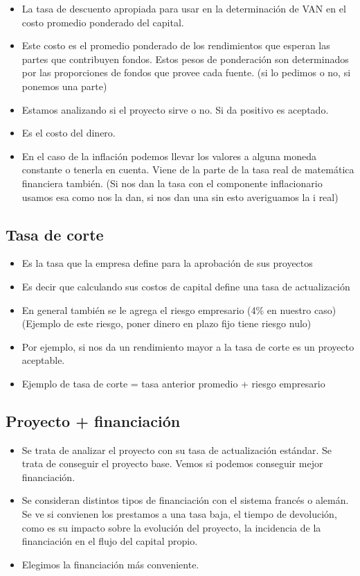 \documentclass[titlepage,a4paper]{article}
\begin{document}
\begin{itemize}
\item La tasa de descuento apropiada para usar en la determinación de VAN en el costo promedio ponderado del capital.
\item Este costo es el promedio ponderado de los rendimientos que esperan las partes que contribuyen fondos. Estos pesos de ponderación son determinados por las proporciones de fondos que provee cada fuente. (si lo pedimos o no, si ponemos una parte)
\item Estamos analizando si el proyecto sirve o no. Si da positivo es aceptado.
\item Es el costo del dinero.
\item En el caso de la inflación podemos llevar los valores a alguna moneda constante o tenerla en cuenta. Viene de la parte de la tasa real de matemática financiera también. (Si nos dan la tasa con el componente inflacionario usamos esa como nos la dan, si nos dan una sin esto averiguamos la i real)
\end{itemize}


\newpage
\subsection{Tasa de corte}

\begin{itemize}
\item Es la tasa que la empresa define para la aprobación de sus proyectos
\item Es decir que calculando sus costos de capital define una tasa de actualización
\item En general también se le agrega el riesgo empresario (4\% en nuestro caso) (Ejemplo de este riesgo, poner dinero en plazo fijo tiene riesgo nulo)
\item Por ejemplo, si nos da un rendimiento mayor a la tasa de corte es un proyecto aceptable.
\item Ejemplo de tasa de corte =  tasa anterior promedio + riesgo empresario
\end{itemize}

\subsection{Proyecto + financiación}

\begin{itemize}
\item Se trata de analizar el proyecto con su tasa de actualización estándar. Se trata de conseguir el proyecto base. Vemos si podemos conseguir mejor financiación.
\item Se consideran distintos tipos de financiación con el sistema francés o alemán. Se ve si convienen los prestamos a una tasa baja, el tiempo de devolución, como es su impacto sobre la evolución del proyecto, la incidencia de la financiación en el flujo del capital propio.
\item Elegimos la financiación más conveniente.
\end{itemize}
\end{document}
